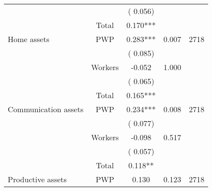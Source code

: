\begin{tabular}{l*{4}{c}}
                               &                               &       (       0.056)                     & &                                                                             \\ 
\cmidrule{2-3}
                               &       Total           &              0.170***                 &    &                                               \\ 
\cmidrule{2-3}
 Home assets                 &       PWP     &              0.283***               &       0.007    & 2718                              \\ 
                               &                               &       (       0.085)                     & &                                                                             \\ 
                               &       Workers         &             -0.052               &        1.000   &                                               \\ 
                               &                               &       (       0.065)                     & &                                                                             \\ 
\cmidrule{2-3}
                               &       Total           &              0.165***                 &    &                                               \\ 
\cmidrule{2-3}
 Communication assets                 &       PWP     &              0.234***               &        0.008   & 2718                              \\ 
                               &                               &       (       0.077)                     & &                                                                             \\ 
                               &       Workers         &             -0.098               &        0.517   &                                               \\ 
                               &                               &       (       0.057)                     & &                                                                             \\ 
\cmidrule{2-3}
                               &       Total           &              0.118**                 &    &                                               \\ 
\cmidrule{2-3}
 Productive assets                 &       PWP     &              0.130               &        0.123   & 2718                              \\ 

\end{tabular}
